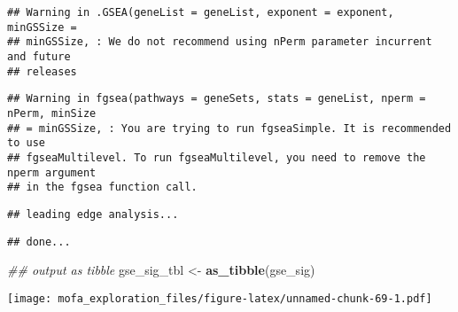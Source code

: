 \documentclass[
]{article}
\newenvironment{Shaded}{\begin{snugshade}}{\end{snugshade}}
\newcommand{\CommentTok}[1]{\textcolor[rgb]{0.56,0.35,0.01}{\textit{#1}}}
\newcommand{\DataTypeTok}[1]{\textcolor[rgb]{0.13,0.29,0.53}{#1}}
\newcommand{\DecValTok}[1]{\textcolor[rgb]{0.00,0.00,0.81}{#1}}
\newcommand{\KeywordTok}[1]{\textcolor[rgb]{0.13,0.29,0.53}{\textbf{#1}}}
\newcommand{\NormalTok}[1]{#1}
\newcommand{\OperatorTok}[1]{\textcolor[rgb]{0.81,0.36,0.00}{\textbf{#1}}}
\newcommand{\StringTok}[1]{\textcolor[rgb]{0.31,0.60,0.02}{#1}}
\begin{document}
\begin{verbatim}
## Warning in .GSEA(geneList = geneList, exponent = exponent, minGSSize =
## minGSSize, : We do not recommend using nPerm parameter incurrent and future
## releases
\end{verbatim}

\begin{verbatim}
## Warning in fgsea(pathways = geneSets, stats = geneList, nperm = nPerm, minSize
## = minGSSize, : You are trying to run fgseaSimple. It is recommended to use
## fgseaMultilevel. To run fgseaMultilevel, you need to remove the nperm argument
## in the fgsea function call.
\end{verbatim}

\begin{verbatim}
## leading edge analysis...
\end{verbatim}

\begin{verbatim}
## done...
\end{verbatim}

\begin{Shaded}
\begin{Highlighting}[]
\CommentTok{## output as tibble}
\NormalTok{gse_sig_tbl <-}\StringTok{ }\KeywordTok{as_tibble}\NormalTok{(gse_sig)}
\end{Highlighting}
\end{Shaded}

\begin{Shaded}
\end{Shaded}

\texttt{[image: mofa\_exploration\_files/figure-latex/unnamed-chunk-69-1.pdf]}
\end{document}
